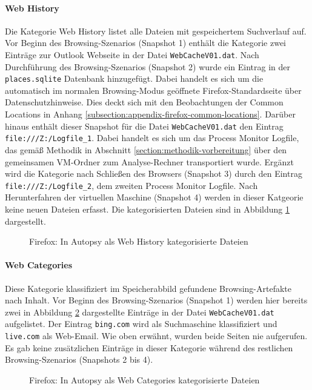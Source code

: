 \begin{appendices}
\paragraph*{Web History}
Die Kategorie \glqq{}Web History\grqq{} listet alle Dateien mit gespeichertem Suchverlauf auf. Vor Beginn des Browsing-Szenarios (Snapshot 1) enthält die Kategorie zwei Einträge zur Outlook Webseite in der Datei \texttt{WebCacheV01.dat}. Nach Durchführung des Browsing-Szenarios (Snapshot 2) wurde ein Eintrag in der \texttt{places.sqlite} Datenbank hinzugefügt. Dabei handelt es sich um die automatisch im normalen Browsing-Modus geöffnete Firefox-Standardseite über Datenschutzhinweise. Dies deckt sich mit den Beobachtungen der Common Locations in Anhang \ref{subsection:appendix-firefox-common-locations}. Darüber hinaus enthält dieser Snapshot für die Datei \texttt{WebCacheV01.dat} den Eintrag \texttt{file:///Z:/Logfile\_1}. Dabei handelt es sich um das Process Monitor Logfile, das gemäß Methodik in Abschnitt \ref{section:methodik-vorbereitung} über den gemeinsamen VM-Ordner zum Analyse-Rechner transportiert wurde. Ergänzt wird die Kategorie nach Schließen des Browsers (Snapshot 3) durch den Eintrag \texttt{file:///Z:/Logfile\_2}, dem zweiten Process Monitor Logfile. Nach Herunterfahren der virtuellen Maschine (Snapshot 4) werden in dieser Katgeorie keine neuen Dateien erfasst. Die kategorisierten Dateien sind in Abbildung \ref{img:firefox-web-history} dargestellt.
\begin{figure}[h!]
	\centerline{}
	\caption{Firefox: In Autopsy als \glqq{}Web History\grqq{} kategorisierte Dateien}
	\label{img:firefox-web-history}  
\end{figure}

\paragraph*{Web Categories}
Diese Kategorie klassifiziert im Speicherabbild gefundene Browsing-Artefakte nach Inhalt.
Vor Beginn des Browsing-Szenarios (Snapshot 1) werden hier bereits zwei in Abbildung \ref{img:firefox-web-categories} dargestellte Einträge in der Datei \texttt{WebCacheV01.dat} aufgelistet. Der Eintrag \texttt{bing.com} wird als \glqq{}Suchmaschine\grqq{} klassifiziert und \texttt{live.com} als \glqq{}Web-Email\grqq{}.
Wie oben erwähnt, wurden beide Seiten nie aufgerufen. Es gab keine zusätzlichen Einträge in dieser Kategorie während des restlichen Browsing-Szenarios (Snapshots 2 bis 4).
\begin{figure}[h!]
	\centerline{}
	\caption{Firefox: In Autopsy als \glqq{}Web Categories\grqq{} kategorisierte Dateien}
	\label{img:firefox-web-categories}  
\end{figure}


\end{appendices}
